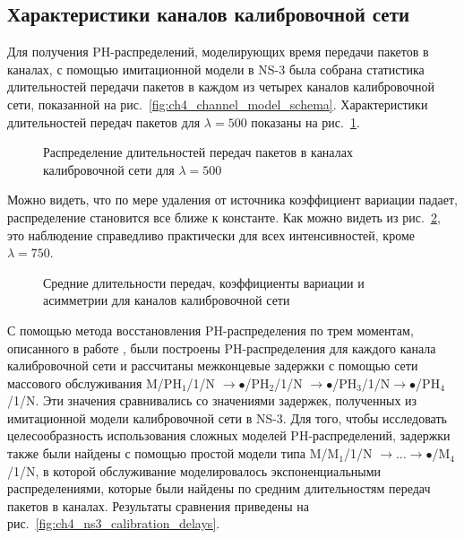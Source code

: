 \subsection{Характеристики каналов калибровочной сети}

Для получения PH-распределений, моделирующих время передачи пакетов в каналах, с помощью имитационной модели в NS-3 была собрана статистика длительностей передачи пакетов в каждом из четырех каналов калибровочной сети, показанной на рис.~\ref{fig:ch4_channel_model_schema}. Характеристики длительностей передач пакетов для $\lambda = 500$ показаны на рис.~\ref{fig:ch4_ns3_calibration_links_densities}.

\begin{figure}[h]
  \caption{Распределение длительностей передач пакетов в каналах калибровочной сети для $\lambda = 500$}
  \label{fig:ch4_ns3_calibration_links_densities}
\end{figure}

Можно видеть, что по мере удаления от источника коэффициент вариации падает, распределение становится все ближе к константе.
Как можно видеть из рис.~\ref{fig:ch4_ns3_calibration_links_koefs}, это наблюдение справедливо практически для всех интенсивностей, кроме $\lambda = 750$.

\begin{figure}[h]
  \caption{Средние длительности передач, коэффициенты вариации и асимметрии для каналов калибровочной сети}
  \label{fig:ch4_ns3_calibration_links_koefs}
\end{figure}

С помощью метода восстановления PH-распределения по трем моментам, описанного в работе \cite{Johnson1989}, были построены PH-распределения для каждого канала калибровочной сети и рассчитаны межконцевые задержки с помощью сети массового обслуживания M/$\text{PH}_1$/1/N $\rightarrow \bullet$/$\text{PH}_2$/1/N $\rightarrow \bullet$/$\text{PH}_3$/1/N$ \rightarrow \bullet$/$\text{PH}_4$/1/N. Эти значения сравнивались со значениями задержек, полученных из имитационной модели калибровочной сети в NS-3. Для того, чтобы исследовать целесообразность использования сложных моделей PH-распределений, задержки также были найдены с помощью простой модели типа M/$\text{M}_1$/1/N $\rightarrow \dots \rightarrow \bullet$/$\text{M}_4$/1/N, в которой обслуживание моделировалось экспоненциальными распределениями, которые были найдены по средним длительностям передач пакетов в каналах. Результаты сравнения приведены на рис.~\ref{fig:ch4_ns3_calibration_delays}.

